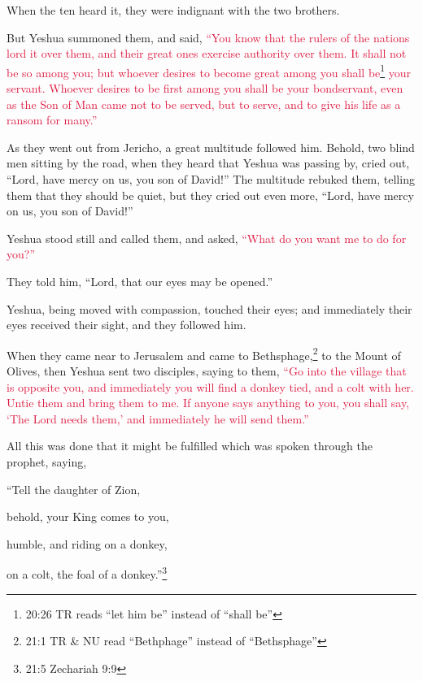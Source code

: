 \myverse{}When the ten heard it, they were indignant with the two brothers.

\myverse{}But Yeshua summoned them, and said,
\textcolor{crimson}{“You know that the rulers of the nations lord it over them, and their great ones exercise authority
	over them.
}
\myverse{}\textcolor{crimson}{It shall not be so among you; but whoever desires to become great among
	you shall be}\footnote{20:26 TR reads “let him be” instead of “shall be”
}
\textcolor{crimson}{your servant.
}
\myverse{}\textcolor{crimson}{Whoever desires to be first among you shall be your bondservant,} \myverse{}\textcolor{crimson}{even as the Son of Man came not to be served, but to serve, and to give his life as a ransom for many.”}

\myverse{}As they went out from Jericho, a great multitude followed him.
\myverse{}Behold, two blind men sitting by the road, when they heard that Yeshua was
passing by, cried out, “Lord, have mercy on us, you son of David!”
\myverse{}The multitude rebuked them, telling them that they should be quiet, but they
cried out even more, “Lord, have mercy on us, you son of David!”

\myverse{}Yeshua stood still and called them, and asked,
\textcolor{crimson}{“What do you want me to do for you?”}

\myverse{}They told him, “Lord, that our eyes may be opened.”

\myverse{}Yeshua, being moved with compassion, touched their eyes; and
immediately their eyes received their sight, and they followed him.


\mychapter{} \myverse*{}When they came near to Jerusalem and came to Bethsphage,\footnote{21:1 TR \& NU read “Bethphage” instead of “Bethsphage”} to the Mount of Olives, then Yeshua
sent two disciples,
\myverse{}saying to them,
\textcolor{crimson}{“Go into the village that is opposite you, and immediately you will find a donkey tied, and a colt
	with her. Untie them and bring them to me.
}
\myverse{}\textcolor{crimson}{If anyone says anything to you, you shall say, ‘The Lord needs them,’ and
	immediately he will send them.”}

\myverse{}All this was done that it might be fulfilled which was spoken
through the prophet, saying,

\myverse{}“Tell the daughter of Zion,

behold, your King comes to you,

humble, and riding on a donkey,

on a colt, the foal of a donkey.”\footnote{21:5 Zechariah 9:9}

